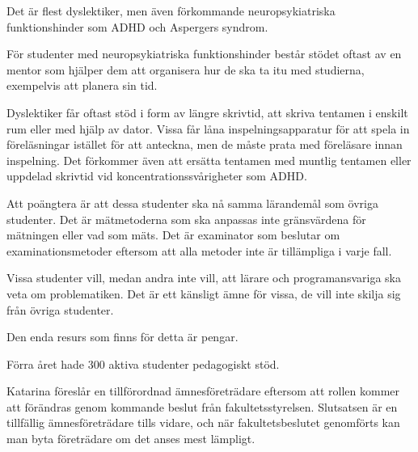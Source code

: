 \documentclass[a4paper,protocol]{miunprot}
\begin{document}
Det är flest dyslektiker, men även förkommande neuropsykiatriska 
funktionshinder som ADHD och Aspergers syndrom.

För studenter med neuropsykiatriska funktionshinder består stödet oftast av en 
mentor som hjälper dem att organisera hur de ska ta itu med studierna, 
exempelvis att planera sin tid.

Dyslektiker får oftast stöd i form av längre skrivtid, att skriva tentamen 
i enskilt rum eller med hjälp av dator.
Vissa får låna inspelningsapparatur för att spela in föreläsningar istället för 
att anteckna, men de måste prata med föreläsare innan inspelning.
Det förkommer även att ersätta tentamen med muntlig tentamen eller uppdelad 
skrivtid vid koncentrationssvårigheter som ADHD.

Att poängtera är att dessa studenter ska nå samma lärandemål som övriga 
studenter.
Det är mätmetoderna som ska anpassas inte gränsvärdena för mätningen eller vad 
som mäts.
Det är examinator som beslutar om examinationsmetoder eftersom att alla metoder 
inte är tillämpliga i varje fall.

Vissa studenter vill, medan andra inte vill, att lärare och programansvariga 
ska veta om problematiken.
Det är ett känsligt ämne för vissa, de vill inte skilja sig från övriga 
studenter.

Den enda resurs som finns för detta är pengar.

Förra året hade 300 aktiva studenter pedagogiskt stöd.


\other
{}

Katarina föreslår en tillförordnad ämnesföreträdare eftersom att rollen kommer 
att förändras genom kommande beslut från fakultetsstyrelsen.
Slutsatsen är en tillfällig ämnesföreträdare tills vidare, och när 
fakultetsbeslutet genomförts kan man byta företrädare om det anses mest 
lämpligt.


\makenextmeeting
\end{document}
